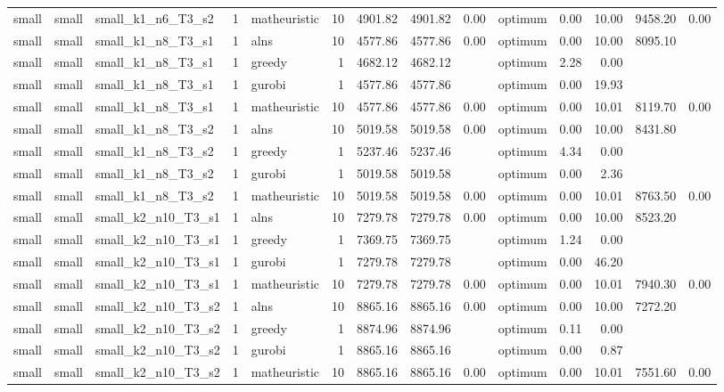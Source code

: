 \begin{tabular}{lllrlrrrrlrrrr}
small & small & small\_k1\_n6\_T3\_s2 & 1 & matheuristic & 10 & 4901.82 & 4901.82 & 0.00 & optimum & 0.00 & 10.00 & 9458.20 & 0.00 \\
small & small & small\_k1\_n8\_T3\_s1 & 1 & alns & 10 & 4577.86 & 4577.86 & 0.00 & optimum & 0.00 & 10.00 & 8095.10 &  \\
small & small & small\_k1\_n8\_T3\_s1 & 1 & greedy & 1 & 4682.12 & 4682.12 &  & optimum & 2.28 & 0.00 &  &  \\
small & small & small\_k1\_n8\_T3\_s1 & 1 & gurobi & 1 & 4577.86 & 4577.86 &  & optimum & 0.00 & 19.93 &  &  \\
small & small & small\_k1\_n8\_T3\_s1 & 1 & matheuristic & 10 & 4577.86 & 4577.86 & 0.00 & optimum & 0.00 & 10.01 & 8119.70 & 0.00 \\
small & small & small\_k1\_n8\_T3\_s2 & 1 & alns & 10 & 5019.58 & 5019.58 & 0.00 & optimum & 0.00 & 10.00 & 8431.80 &  \\
small & small & small\_k1\_n8\_T3\_s2 & 1 & greedy & 1 & 5237.46 & 5237.46 &  & optimum & 4.34 & 0.00 &  &  \\
small & small & small\_k1\_n8\_T3\_s2 & 1 & gurobi & 1 & 5019.58 & 5019.58 &  & optimum & 0.00 & 2.36 &  &  \\
small & small & small\_k1\_n8\_T3\_s2 & 1 & matheuristic & 10 & 5019.58 & 5019.58 & 0.00 & optimum & 0.00 & 10.01 & 8763.50 & 0.00 \\
small & small & small\_k2\_n10\_T3\_s1 & 1 & alns & 10 & 7279.78 & 7279.78 & 0.00 & optimum & 0.00 & 10.00 & 8523.20 &  \\
small & small & small\_k2\_n10\_T3\_s1 & 1 & greedy & 1 & 7369.75 & 7369.75 &  & optimum & 1.24 & 0.00 &  &  \\
small & small & small\_k2\_n10\_T3\_s1 & 1 & gurobi & 1 & 7279.78 & 7279.78 &  & optimum & 0.00 & 46.20 &  &  \\
small & small & small\_k2\_n10\_T3\_s1 & 1 & matheuristic & 10 & 7279.78 & 7279.78 & 0.00 & optimum & 0.00 & 10.01 & 7940.30 & 0.00 \\
small & small & small\_k2\_n10\_T3\_s2 & 1 & alns & 10 & 8865.16 & 8865.16 & 0.00 & optimum & 0.00 & 10.00 & 7272.20 &  \\
small & small & small\_k2\_n10\_T3\_s2 & 1 & greedy & 1 & 8874.96 & 8874.96 &  & optimum & 0.11 & 0.00 &  &  \\
small & small & small\_k2\_n10\_T3\_s2 & 1 & gurobi & 1 & 8865.16 & 8865.16 &  & optimum & 0.00 & 0.87 &  &  \\
small & small & small\_k2\_n10\_T3\_s2 & 1 & matheuristic & 10 & 8865.16 & 8865.16 & 0.00 & optimum & 0.00 & 10.01 & 7551.60 & 0.00 \\

\end{tabular}

